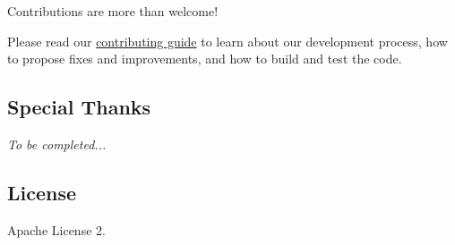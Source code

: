 Contributions are more than welcome!

Please read our \hyperlink{_c_o_n_t_r_i_b_u_t_i_n_g_8md}{contributing guide} to learn about our development process, how to propose fixes and improvements, and how to build and test the code.

\subsection*{Special Thanks}

{\itshape To be completed...}

\subsection*{License}

Apache License 2. 